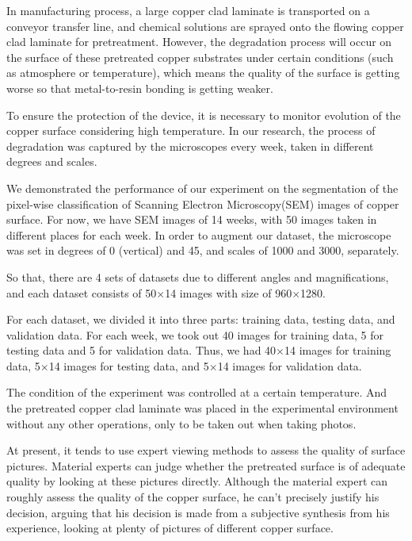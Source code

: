 \documentclass[10pt,twocolumn,letterpaper]{article}
\begin{document}
In manufacturing process, a large copper clad laminate is transported on a conveyor transfer line, and chemical solutions are sprayed onto the flowing copper clad laminate for pretreatment.
However, the degradation process will occur on the surface of these pretreated copper substrates under certain conditions (such as atmosphere or temperature), which means the quality of the surface is getting worse so that metal-to-resin bonding is getting weaker.

To ensure the protection of the device, it is necessary to monitor evolution of the copper surface considering high temperature.
In our research, the process of degradation was captured by the microscopes every week, taken in different degrees and scales.

We demonstrated the performance of our experiment on the segmentation of the pixel-wise classification of Scanning Electron Microscopy(SEM) images of copper surface. For now, we have SEM images of 14 weeks, with 50 images taken in different places for each week.
In order to augment our dataset, the microscope was set in degrees of 0 (vertical) and 45, and scales of 1000 and 3000, separately.

So that, there are 4 sets of datasets due to different angles and magnifications, and each dataset consists of 50$\times$14 images with size of 960$\times$1280.

For each dataset, we divided it into three parts: training data, testing data, and validation data.
For each week, we took out 40 images for training data, 5 for testing data and 5 for validation data.
Thus, we had 40$\times$14 images for training data, 5$\times$14 images for testing data, and 5$\times$14 images for validation data.

The condition of the experiment was controlled at a certain temperature. And the pretreated copper clad laminate was placed in the experimental environment without any other operations, only to be taken out when taking photos. 

At present, it tends to use expert viewing methods to assess the quality of surface pictures.
Material experts can judge whether the pretreated surface is of adequate quality by looking at these pictures directly.
Although the material expert can roughly assess the quality of the copper surface, he can't precisely justify his decision, arguing that his decision is made from a subjective synthesis from his experience, looking at plenty of pictures of different copper surface.
\end{document}
